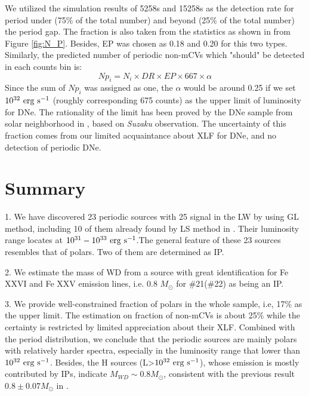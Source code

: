 \documentclass[fleqn,usenatbib]{mnras}
\begin{document}
We utilized the simulation results of 5258s and 15258s as the detection rate for period under (75\% of the total number) and beyond (25\% of the total number) the period gap. The fraction is also taken from the statistics as shown in from Figure \ref{fig:N_P}. Besides, EP was chosen as 0.18 and 0.20 for this two types.
Similarly, the predicted number of periodic non-mCVs which "should" be detected in each counts bin is:
\begin{equation}
Np_{i}=N_i\times DR \times EP \times 667 \times \alpha	
\end{equation}
Since the sum of $Np_{i}$ was assigned as one, the $\alpha$ would be around 0.25 if we set $\rm 10^{32}~erg~s^{-1}$ (roughly corresponding 675 counts) as the upper limit of luminosity for DNe. The rationality of the limit has been proved by the DNe sample from solar neighborhood in \citep{2016ApJ...818..136X}, based on {\it Suzaku} observation. The uncertainty of this fraction comes from our limited acquaintance about XLF for DNe, and no detection of periodic DNe. 


\section{Summary}\label{sec:summary}

1. We have discovered 23 periodic sources with 25 signal in the LW by using GL method, including 10 of them already found by LS method in \cite{2012ApJ...746..165H}. Their luminosity range locates at $\rm 10^{31}-10^{33}~erg~s^{-1} $.The general feature of these 23 sources resembles that of polars. Two of them are determined as IP.

2.  We estimate the mass of WD from a source with great identification for Fe XXVI and Fe XXV emission lines, i.e. 0.8 $M_\odot$ for \#21(\#22) as being an IP. 

3. We provide well-constrained fraction of polars in the whole sample, i.e, 17\% as the upper limit. The estimation on fraction of non-mCVs is about 25\% while the certainty is restricted by limited appreciation about their XLF. Combined with the period distribution, we conclude that the periodic sources are mainly polars with relatively harder spectra, especially in the luminosity range that lower than $\rm 10^{32}~erg~s^{-1}$. Besides, the H sources (L>$\rm 10^{32}~erg~s^{-1}$), whose emission is mostly contributed by IPs, indicate  $M_{WD} \sim 0.8 M_\odot$, consistent with the previous result $0.8\pm 0.07 M_\odot$ in \citep{2018ApJ...853..182Y}.
\end{document}

